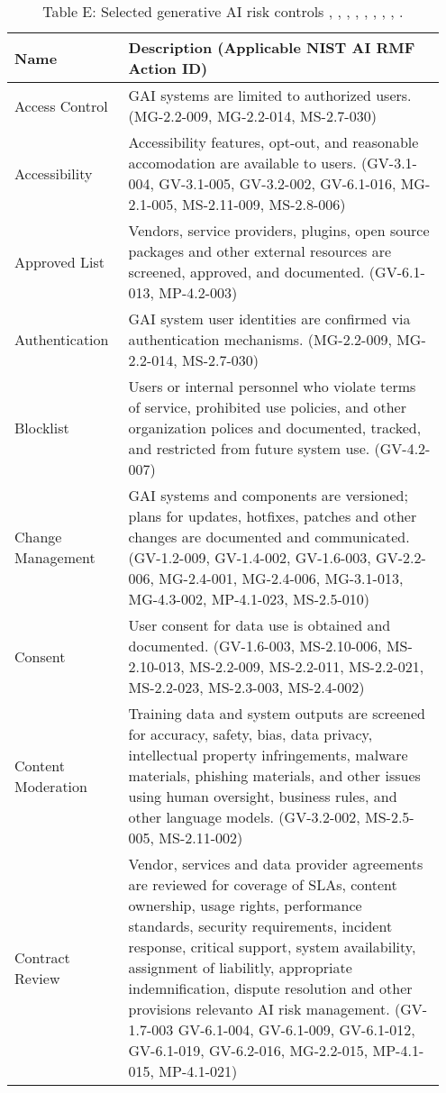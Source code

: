 \documentclass[fleqn]{article}
\begin{document}
\begin{table}[H]
	\caption*{Table E: Selected generative AI risk controls \cite{airmf}, \cite{playbook}, \cite{ai600-1}, \cite{iso42001}, \cite{mcgraw2024architectural}, \cite{mcgraw2020architectural}, \cite{msft_rai_std}, \cite{uk_ai_safety}, \cite{occ_mrm}. }
	\label{tab:controls}
	\footnotesize
	\begin{tabular}{|m{0.25\linewidth} |m{0.70\linewidth} |}
		\hline
		\textbf{Name} & \textbf{Description} (Applicable NIST AI RMF Action ID) \\
		\hline
		Access Control  & GAI systems are limited to authorized users. (MG-2.2-009, MG-2.2-014, MS-2.7-030) \\ 
		\hline
		Accessibility  & Accessibility features, opt-out, and reasonable accomodation are available to users. (GV-3.1-004, GV-3.1-005, GV-3.2-002, GV-6.1-016, MG-2.1-005, MS-2.11-009, MS-2.8-006) \\ 
		\hline
		Approved List & Vendors, service providers, plugins, open source packages and other external resources are screened, approved, and documented. (GV-6.1-013, MP-4.2-003) \\ \hline
		Authentication  & GAI system user identities are confirmed via authentication mechanisms. (MG-2.2-009, MG-2.2-014, MS-2.7-030) \\ 
		\hline
		Blocklist & Users or internal personnel who violate terms of service, prohibited use policies, and other organization polices and documented, tracked, and restricted from future system use. (GV-4.2-007) \\ \hline		
		Change Management & GAI systems and components are versioned; plans for updates, hotfixes, patches and other changes are documented and communicated. (GV-1.2-009, GV-1.4-002, GV-1.6-003, GV-2.2-006, 		MG-2.4-001, MG-2.4-006, MG-3.1-013, MG-4.3-002, MP-4.1-023, 
		MS-2.5-010)  \\ 
		\hline
		Consent & User consent for data use is obtained and documented. (GV-1.6-003, MS-2.10-006, MS-2.10-013, MS-2.2-009, MS-2.2-011, 	MS-2.2-021, MS-2.2-023, MS-2.3-003, MS-2.4-002)  \\ \hline
		Content Moderation & Training data and system outputs are screened for accuracy, safety, bias, data privacy, intellectual property infringements, malware materials, phishing materials, and other issues using human oversight, business rules, and other language models. (GV-3.2-002, MS-2.5-005, MS-2.11-002)  \\ \hline
		Contract Review & Vendor, services and data provider agreements are reviewed for coverage of SLAs, content ownership, usage rights, performance standards, security requirements, incident response, critical support, system availability, assignment of liabilitly, appropriate indemnification, dispute resolution and other provisions relevanto AI risk management. (GV-1.7-003 GV-6.1-004, GV-6.1-009, GV-6.1-012, GV-6.1-019, GV-6.2-016, 		MG-2.2-015, MP-4.1-015, MP-4.1-021) \\ 

\end{tabular}
\end{table}
\end{document}
